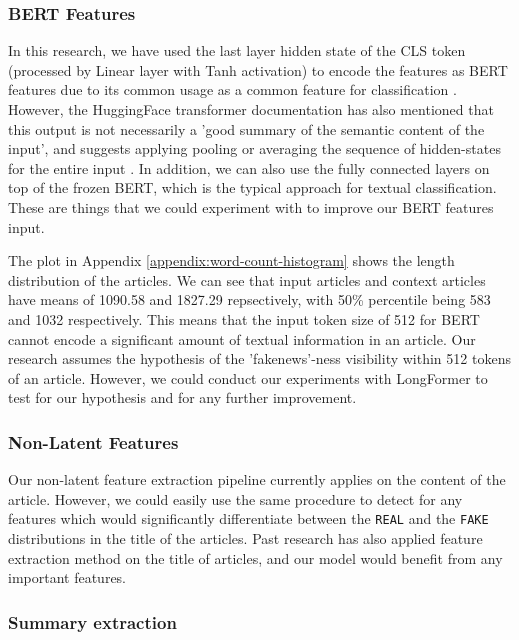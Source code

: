 \documentclass{article}
\begin{document}
\subsubsection*{BERT Features}\label{limitation:bert-features}
In this research, we have used the last layer hidden state of the CLS token (processed by Linear layer with Tanh activation) to encode the features as BERT features due to its common usage as a common feature for classification \cite{huggingface-transformer}. However, the HuggingFace transformer documentation has also mentioned that this output is not necessarily a 'good summary of the semantic content of the input', and suggests applying pooling or averaging the sequence of hidden-states for the entire input \cite{huggingface-transformer}. In addition, we can also use the fully connected layers on top of the frozen BERT, which is the typical approach for textual classification. These are things that we could experiment with to improve our BERT features input.

The plot in Appendix \ref{appendix:word-count-histogram} shows the length distribution of the articles. We can see that input articles and context articles have means of 1090.58 and 1827.29 repsectively, with 50\% percentile being 583 and 1032 respectively. This means that the input token size of 512 for BERT cannot encode a significant amount of textual information in an article. Our research assumes the hypothesis of the 'fakenews'-ness visibility within 512 tokens of an article. However, we could conduct our experiments with LongFormer to test for our hypothesis and for any further improvement.

\subsubsection*{Non-Latent Features}\label{limitation:non-latent-features}
Our non-latent feature extraction pipeline currently applies on the content of the article. However, we could easily use the same procedure to detect for any features which would significantly differentiate between the \texttt{REAL} and the \texttt{FAKE} distributions in the title of the articles. Past research has also applied feature extraction method on the title of articles, and our model would benefit from any important features.

\subsubsection*{Summary extraction}\label{limitation:summary-extraction}
\end{document}
